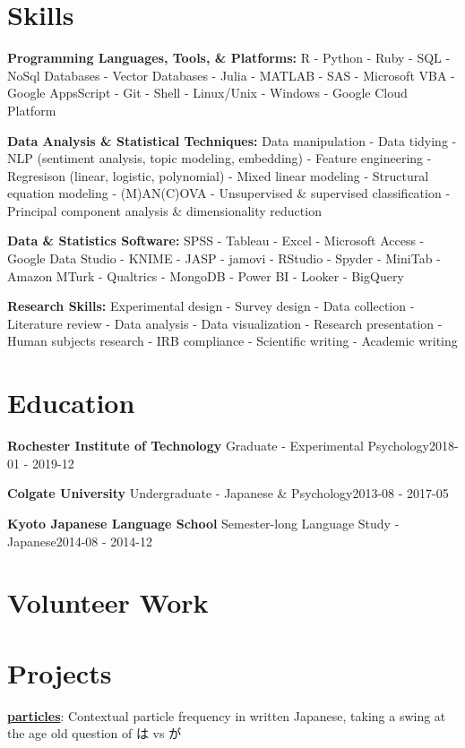 \documentclass[a4paper,9pt]{extarticle}
\begin{document}
\section*{Skills}
\noindent\textbf{Programming Languages, Tools, \& Platforms:} R - Python - Ruby - SQL - NoSql Databases - Vector Databases - Julia - MATLAB - SAS - Microsoft VBA - Google AppsScript - Git - Shell - Linux/Unix - Windows - Google Cloud Platform

\noindent\textbf{Data Analysis \& Statistical Techniques:} Data manipulation - Data tidying - NLP (sentiment analysis, topic modeling, embedding) - Feature engineering - Regresison (linear, logistic, polynomial) - Mixed linear modeling - Structural equation modeling - (M)AN(C)OVA - Unsupervised \& supervised classification - Principal component analysis \& dimensionality reduction

\noindent\textbf{Data \& Statistics Software:} SPSS - Tableau - Excel - Microsoft Access - Google Data Studio - KNIME - JASP - jamovi - RStudio - Spyder - MiniTab - Amazon MTurk - Qualtrics - MongoDB - Power BI - Looker - BigQuery

\noindent\textbf{Research Skills:} Experimental design - Survey design - Data collection - Literature review - Data analysis - Data visualization - Research presentation - Human subjects research - IRB compliance - Scientific writing - Academic writing

\section*{Education}
\noindent\textbf{Rochester Institute of Technology}
Graduate - Experimental Psychology\hfill2018-01 - 2019-12

\noindent\textbf{Colgate University}
Undergraduate - Japanese \& Psychology\hfill2013-08 - 2017-05

\noindent\textbf{Kyoto Japanese Language School}
Semester-long Language Study - Japanese\hfill2014-08 - 2014-12

\section*{Volunteer Work}

\section*{Projects}
\noindent\textbf{\href{https://github.com/ryancahildebrandt/particles}{particles}}: Contextual particle frequency in written Japanese, taking a swing at the age old question of は vs が
\end{document}
